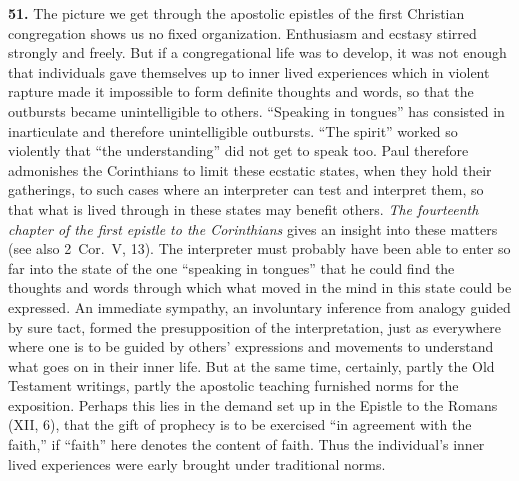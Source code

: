 \documentclass[12pt,a4paper]{book}
\newcommand{\opage}[1]{\marginnote{\footnotesize\textit{[#1]}}}
\begin{document}
\noindent\textbf{51.} The picture we get through the apostolic epistles of the first Christian
congregation shows us no fixed organization. Enthusiasm and ecstasy stirred strongly and freely.
But if a congregational life was to develop, it was not enough that individuals gave themselves up
to inner lived experiences which in violent rapture 
\opage{113}made it impossible to form definite thoughts
and words, so that the outbursts became unintelligible to others. ``Speaking in tongues'' has
consisted in inarticulate and therefore unintelligible outbursts. ``The spirit'' worked so
violently that ``the understanding'' did not get to speak too. Paul therefore admonishes the
Corinthians to limit these ecstatic states, when they hold their gatherings, to such cases where an
interpreter can test and interpret them, so that what is lived through in these states may benefit
others. \emph{The fourteenth chapter of the first epistle to the Corinthians} gives an insight into
these matters (see also 2~Cor.\ V, 13). The interpreter must probably have been able to enter so
far into the state of the one ``speaking in tongues'' that he could find the thoughts and words
through which what moved in the mind in this state could be expressed. An immediate sympathy, an
involuntary inference from analogy guided by sure tact, formed the presupposition of the
interpretation, just as everywhere where one is to be guided by others' expressions and movements
to understand what goes on in their inner life. But at the same time, certainly, partly the Old
Testament writings, partly the apostolic teaching furnished norms for the exposition. Perhaps this
lies in the demand set up in the Epistle to the Romans (XII, 6), that the gift of prophecy is to be
exercised ``in agreement with the faith,'' if ``faith'' here denotes the content of faith. Thus the
individual's inner lived experiences were early brought under traditional norms.
\end{document}
